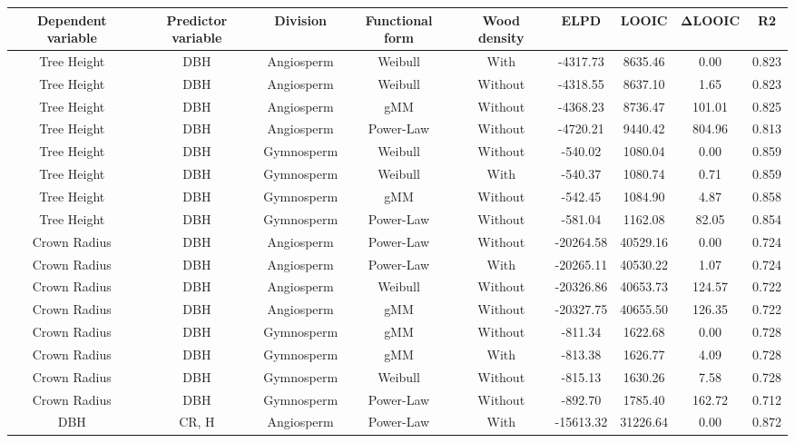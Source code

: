 \documentclass[
  12pt,
  letterpaper,
  DIV=11,
  numbers=noendperiod]{scrartcl}
\begin{document}
\newpage

\begingroup\fontsize{10}{12}\selectfont

\begin{longtable*}[t]{ccccccccc}
\toprule
Dependent variable & Predictor variable & Division & Functional form & Wood density & ELPD & LOOIC & ΔLOOIC & R2\\
\midrule
Tree Height & DBH & Angiosperm & Weibull & With & -4317.73 & 8635.46 & 0.00 & 0.823\\
Tree Height & DBH & Angiosperm & Weibull & Without & -4318.55 & 8637.10 & 1.65 & 0.823\\
Tree Height & DBH & Angiosperm & gMM & Without & -4368.23 & 8736.47 & 101.01 & 0.825\\
Tree Height & DBH & Angiosperm & Power-Law & Without & -4720.21 & 9440.42 & 804.96 & 0.813\\
Tree Height & DBH & Gymnosperm & Weibull & Without & -540.02 & 1080.04 & 0.00 & 0.859\\
\addlinespace
Tree Height & DBH & Gymnosperm & Weibull & With & -540.37 & 1080.74 & 0.71 & 0.859\\
Tree Height & DBH & Gymnosperm & gMM & Without & -542.45 & 1084.90 & 4.87 & 0.858\\
Tree Height & DBH & Gymnosperm & Power-Law & Without & -581.04 & 1162.08 & 82.05 & 0.854\\
Crown Radius & DBH & Angiosperm & Power-Law & Without & -20264.58 & 40529.16 & 0.00 & 0.724\\
Crown Radius & DBH & Angiosperm & Power-Law & With & -20265.11 & 40530.22 & 1.07 & 0.724\\
\addlinespace
Crown Radius & DBH & Angiosperm & Weibull & Without & -20326.86 & 40653.73 & 124.57 & 0.722\\
Crown Radius & DBH & Angiosperm & gMM & Without & -20327.75 & 40655.50 & 126.35 & 0.722\\
Crown Radius & DBH & Gymnosperm & gMM & Without & -811.34 & 1622.68 & 0.00 & 0.728\\
Crown Radius & DBH & Gymnosperm & gMM & With & -813.38 & 1626.77 & 4.09 & 0.728\\
Crown Radius & DBH & Gymnosperm & Weibull & Without & -815.13 & 1630.26 & 7.58 & 0.728\\
\addlinespace
Crown Radius & DBH & Gymnosperm & Power-Law & Without & -892.70 & 1785.40 & 162.72 & 0.712\\
DBH & CR, H & Angiosperm & Power-Law & With & -15613.32 & 31226.64 & 0.00 & 0.872\\

\end{longtable*}
\end{document}
